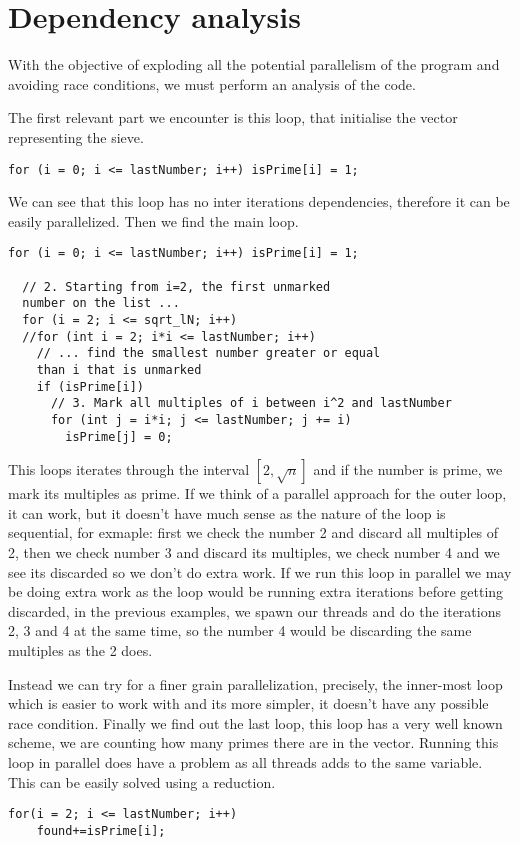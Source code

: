 \section{Dependency analysis}
With the objective of exploding all the potential parallelism of the program and avoiding race conditions, we must perform an analysis of the code.

\justify
The first relevant part we encounter is this loop, that initialise the vector representing the sieve. 
\begin{lstlisting}[caption={Initial loop}, captionpos=b]
for (i = 0; i <= lastNumber; i++) isPrime[i] = 1;
\end{lstlisting}
We can see that this loop has no inter iterations dependencies, therefore it can be easily parallelized.
\justify
Then we find the main loop.
\begin{lstlisting}[caption={Main loop}, captionpos=b]
 for (i = 0; i <= lastNumber; i++) isPrime[i] = 1;

  // 2. Starting from i=2, the first unmarked 
  number on the list ...
  for (i = 2; i <= sqrt_lN; i++)
  //for (int i = 2; i*i <= lastNumber; i++)
    // ... find the smallest number greater or equal 
    than i that is unmarked 
    if (isPrime[i])
      // 3. Mark all multiples of i between i^2 and lastNumber
      for (int j = i*i; j <= lastNumber; j += i) 
        isPrime[j] = 0;
\end{lstlisting}

\justify
This loops iterates through the interval $[2,\sqrt{n}]$ and if the number is prime, we mark its multiples as prime.
\justify
If we think of a parallel approach for the outer loop, it can work, but it doesn't have much sense as the nature of the loop is sequential, for exmaple: first we check the number 2 and discard all multiples of 2, then we check number 3 and discard its multiples, we check number 4 and we see its discarded so we don't do extra work. If we run this loop in parallel we may be doing extra work as the loop would be running extra iterations before getting discarded, in the previous examples, we spawn our threads and do the iterations 2, 3 and 4 at the same time, so the number 4 would be discarding the same multiples as the 2 does.

\justify
Instead we can try for a finer grain parallelization, precisely, the inner-most loop which is easier to work with and its more simpler, it doesn't have any possible race condition.
\clearpage
\justify
Finally we find out the last loop, this loop has a very well known scheme, we are counting how many primes there are in the vector. Running this loop in parallel does have a problem as all threads adds to the same variable. This can be easily solved using a reduction.
\begin{lstlisting}
for(i = 2; i <= lastNumber; i++)
    found+=isPrime[i];
\end{lstlisting}

